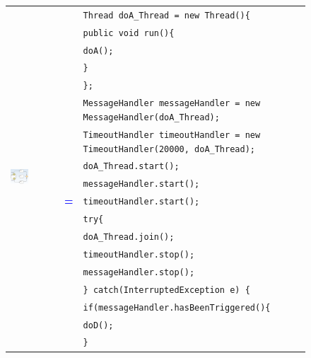 \begin{figure}[h]
\begin{tabularx}{\linewidth}{lcX}
	\multirow{29}{*}{\includegraphics[width=0.4\textwidth]{images/mapping/event_handler.png}} &  & \texttt{Thread doA\_Thread = new Thread()\{}\\
	& & \texttt{\hspace{10pt}public void run()\{}\\
	& & \texttt{\hspace{20pt}doA();}\\
	& & \texttt{\hspace{10pt}\}}\\
	& & \texttt{\};}\\
	& & \texttt{MessageHandler messageHandler = new MessageHandler(doA\_Thread);}\\
	& & \texttt{TimeoutHandler timeoutHandler = new TimeoutHandler(20000, doA\_Thread);}\\
	& & \texttt{doA\_Thread.start();}\\
	& & \texttt{messageHandler.start();}\\
	& \textbf{\textcolor{blue}{=}} & \texttt{timeoutHandler.start();}\\
	& & \texttt{try\{}\\
	& & \texttt{\hspace{10pt}doA\_Thread.join();}\\
	& & \texttt{\hspace{10pt}timeoutHandler.stop();}\\
	& & \texttt{\hspace{10pt}messageHandler.stop();}\\
	& & \texttt{\} catch(InterruptedException e) \{}\\
	& & \texttt{\hspace{10pt}if(messageHandler.hasBeenTriggered()\{}\\
	& & \texttt{\hspace{20pt}doD();}\\
	& & \texttt{\hspace{10pt}\}}\\

\end{tabularx}
\end{figure}
